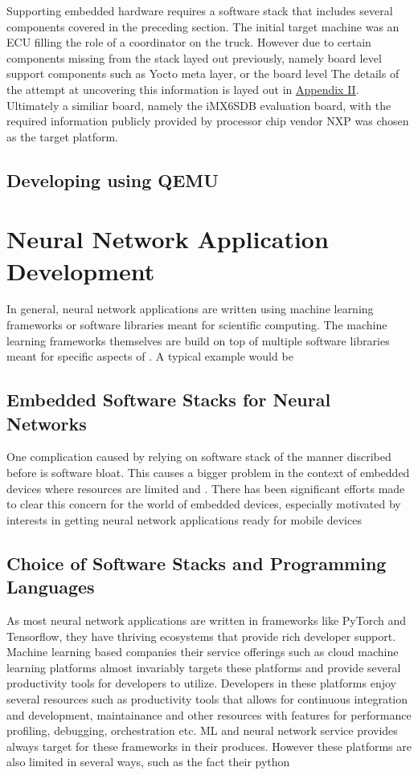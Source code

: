 Supporting embedded hardware requires a software stack that includes several components covered in the preceding section. The initial target machine was an ECU filling the role of a coordinator on the truck. However due to certain components missing from the stack layed out previously, namely board level support components such as Yocto meta layer, or the board level The details of the attempt at uncovering this information is layed out in \hyperref[rtc-c300]{Appendix II}. Ultimately a similiar board, namely the iMX6SDB evaluation board, with the required information publicly provided by processor chip vendor NXP was chosen as the target platform.

\subsection{Developing using QEMU}

\section{Neural Network Application Development}

In general, neural network applications are written using machine learning frameworks or software libraries meant for scientific computing. The machine learning frameworks themselves are build on top of multiple software libraries meant for specific aspects of . A typical example would be

\subsection{Embedded Software Stacks for Neural Networks}

One complication caused by relying on software stack of the manner discribed before is software bloat. This causes a bigger problem in the context of embedded devices where resources are limited and . There has been significant efforts made to clear this concern for the world of embedded devices, especially motivated by interests in getting neural network applications ready for mobile devices

\subsection{Choice of Software Stacks and Programming Languages}

As most neural network applications are written in frameworks like PyTorch and Tensorflow, they have thriving ecosystems that provide rich developer support. Machine learning based companies their service offerings such as cloud machine learning platforms almost invariably targets these platforms and provide several productivity tools for developers to utilize. Developers in these platforms enjoy several resources such as productivity tools that allows for continuous integration and development, maintainance and other resources with features for performance profiling, debugging, orchestration etc. ML and neural network service provides always target for these frameworks in their produces. However these platforms are also limited in several ways, such as the fact their python

